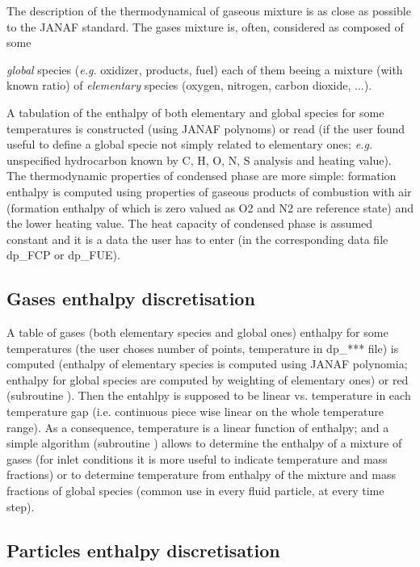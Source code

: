 The description of the thermodynamical of gaseous mixture is as close as
possible to the JANAF standard. The gases mixture is, often, considered as
composed of some {\textit{global} species (\emph{e.g.} oxidizer, products, fuel) each of
them beeing a mixture (with known ratio) of \textit{elementary} species
(oxygen, nitrogen, carbon dioxide, ...).

A tabulation of the enthalpy of both elementary and global species for some
temperatures is constructed (using JANAF polynoms) or read (if the user found
useful to define a global specie not simply related to elementary ones;
\emph{e.g.} unspecified hydrocarbon known by C, H, O, N, S analysis and heating
value). The thermodynamic properties of condensed phase are more simple:
formation enthalpy is computed using properties of gaseous products of
combustion with air (formation enthalpy of which is zero valued as O2 and N2
are reference state) and the lower heating value. The heat capacity of
condensed phase is assumed constant and it is a data the user has to enter (in
the corresponding data file dp\_FCP or dp\_FUE).

\subsection{Gases enthalpy discretisation}

A table of gases (both elementary species and global ones) enthalpy for some
temperatures (the user choses number of points, temperature in dp\_*** file) is
computed (enthalpy of elementary species is computed using JANAF polynomia;
enthalpy for global species are computed by weighting of elementary ones) or red
(subroutine ). Then the entahlpy is supposed to be linear
vs. temperature in each temperature gap (i.e. continuous piece wise linear on
the whole temperature range). As a consequence, temperature is a linear function
of enthalpy; and a simple algorithm (subroutine ) allows to
determine the enthalpy of a mixture of gases (for inlet conditions it is more
useful to indicate temperature and mass fractions) or to determine temperature
from enthalpy of the mixture and mass fractions of global species (common use in
every fluid particle, at every time step).

\subsection{Particles enthalpy discretisation}

}
